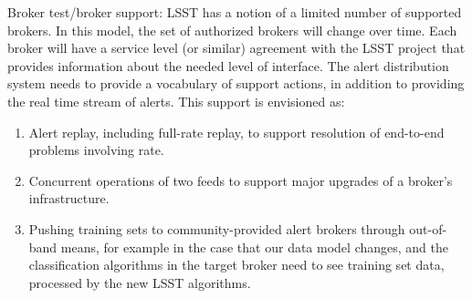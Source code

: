 Broker test/broker support: LSST has a notion of a limited number of supported brokers. In this model, the set of authorized brokers will change over time. Each broker will have a service level (or similar) agreement with the LSST project that provides information about the needed level of interface. The alert distribution system needs to provide a vocabulary of support actions, in addition to providing the real time stream of alerts. This support is envisioned as:

\begin{enumerate}

\item Alert replay, including full-rate replay, to support resolution of end-to-end problems involving rate.

\item Concurrent operations of two feeds to support major upgrades of a broker’s infrastructure.

\item Pushing training sets to community-provided alert brokers through out-of-band means, for example in the case that our data model changes, and the classification algorithms in the target broker need to see training set data, processed by the new LSST algorithms.

\end{enumerate}
